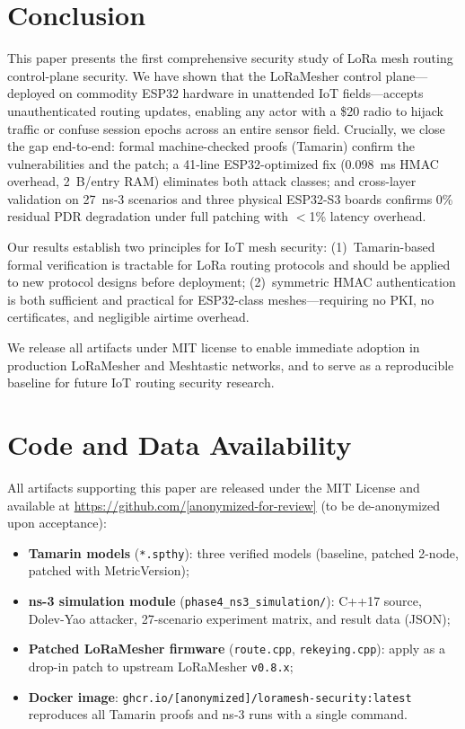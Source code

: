 \documentclass[10pt,journal,compsoc]{IEEEtran}
\begin{document}
\section{Conclusion}
\label{sec:conclusion}

This paper presents the first comprehensive security study of LoRa
mesh routing control-plane security. We have shown that
the LoRaMesher control plane—deployed on commodity ESP32 hardware
in unattended IoT fields—accepts unauthenticated routing updates,
enabling any actor with a \$20 radio to hijack traffic or confuse
session epochs across an entire sensor field. Crucially, we close
the gap end-to-end: formal machine-checked proofs (Tamarin) confirm
the vulnerabilities and the patch; a 41-line ESP32-optimized fix
(0.098~ms HMAC overhead, 2~B/entry RAM) eliminates both attack
classes; and cross-layer validation on 27~ns-3 scenarios and three
physical ESP32-S3 boards confirms 0\% residual PDR degradation
under full patching with $<$1\% latency overhead.

Our results establish two principles for IoT mesh security:
(1)~Tamarin-based formal verification is tractable for LoRa
routing protocols and should be applied to new protocol designs
before deployment; (2)~symmetric HMAC authentication is both
sufficient and practical for ESP32-class meshes—requiring no PKI,
no certificates, and negligible airtime overhead.

We release all artifacts under MIT license to enable immediate
adoption in production LoRaMesher and Meshtastic networks, and
to serve as a reproducible baseline for future IoT routing
security research.

\section*{Code and Data Availability}

All artifacts supporting this paper are released under the MIT License
and available at \url{https://github.com/[anonymized-for-review]}
(to be de-anonymized upon acceptance):

\begin{itemize}
  \item \textbf{Tamarin models} (\texttt{*.spthy}):
    three verified models (baseline, patched 2-node, patched with MetricVersion);
  \item \textbf{ns-3 simulation module} (\texttt{phase4\_ns3\_simulation/}):
    C++17 source, Dolev-Yao attacker, 27-scenario experiment matrix, and
    result data (JSON);
  \item \textbf{Patched LoRaMesher firmware} (\texttt{route.cpp},
    \texttt{rekeying.cpp}): apply as a drop-in patch to upstream
    LoRaMesher \texttt{v0.8.x};
  \item \textbf{Docker image}:
    \texttt{ghcr.io/[anonymized]/loramesh-security:latest}
    reproduces all Tamarin proofs and ns-3 runs with a single command.
\end{itemize}
\end{document}
